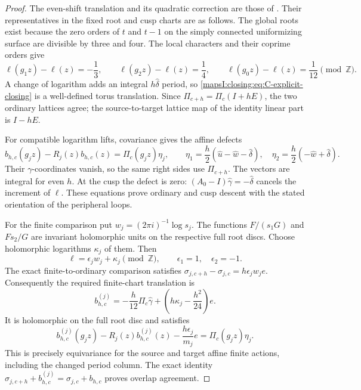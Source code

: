 \begin{proof}
The even-shift translation and its quadratic correction are those of \citet[Proposition~7.8, pp.~91--92, and Proposition~C.2, p.~102]{DuEtAl2026v1}. Their representatives in the fixed root and cusp charts are as follows.
The global roots exist because the zero orders of \(t\) and \(t-1\)
on the simply connected uniformizing surface are divisible by three
and four. The local characters and their coprime orders give
\[
 \ell(g_1z)-\ell(z)=-\frac13,\qquad
 \ell(g_2z)-\ell(z)=\frac14,\qquad
 \ell(g_0z)-\ell(z)=\frac1{12}\pmod{\mathbb Z}.
\]
A change of logarithm adds an integral \(h\widehat\delta\) period,
so \eqref{mapsI:closing:eq:C-explicit-closing} is a well-defined torus translation.
Since \(\Pi_{c+h}=\Pi_c(I+hE)\), the two ordinary lattices agree;
the source-to-target lattice map of the identity linear part is
\(I-hE\).

For compatible logarithm lifts, covariance gives the affine defects
\[
 b_{h,c}(g_jz)-R_j(z)b_{h,c}(z)
       =\Pi_c(g_jz)\eta_j,\qquad
 \eta_1=\frac h2(\widehat u-\widehat w-\widehat\delta),\quad
 \eta_2=\frac h2(-\widehat w+\widehat\delta).
\]
Their \(\gamma\)-coordinates vanish, so the same right sides use
\(\Pi_{c+h}\). The vectors are integral for even \(h\). At the
cusp the defect is zero: \((A_0-I)\widehat\gamma=-\widehat\delta\)
cancels the increment of \(\ell\). These equations prove ordinary
and cusp descent with the stated orientation of the peripheral
loops.

For the finite comparison put \(w_j=(2\pi i)^{-1}\log s_j\).
The functions \(F/(s_1G)\) and \(Fs_2/G\) are invariant
holomorphic units on the respective full root discs. Choose
holomorphic logarithms \(\kappa_j\) of them. Then
\[
 \ell=\epsilon_jw_j+\kappa_j\pmod{\mathbb Z},\qquad
 \epsilon_1=1,\quad\epsilon_2=-1.
\]
The exact finite-to-ordinary comparison satisfies
\(\sigma_{j,c+h}-\sigma_{j,c}=h\epsilon_jw_je\).
Consequently the required finite-chart translation is
\[
 b^{(j)}_{h,c}
 =-\frac h{12}\Pi_c\widehat\gamma
       +\left(h\kappa_j-\frac{h^2}{24}\right)e.
\]
It is holomorphic on the full root disc and satisfies
\[
 b^{(j)}_{h,c}(g_jz)-R_j(z)b^{(j)}_{h,c}(z)
       -\frac{h\epsilon_j}{m_j}e
 =\Pi_c(g_jz)\eta_j.
\]
This is precisely equivariance for the source and target affine
finite actions, including the changed period column. The exact
identity
\(\sigma_{j,c+h}+b^{(j)}_{h,c}
=\sigma_{j,c}+b_{h,c}\) proves overlap agreement. 


\end{proof}
